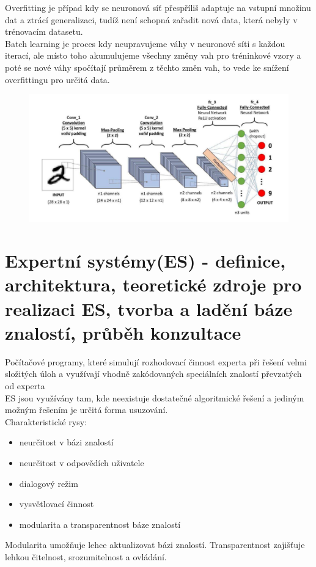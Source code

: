 Overfitting je případ kdy se neuronová síť přespříliš adaptuje na vstupní množinu dat a ztrácí generalizaci, tudíž není schopná zařadit nová data, která nebyly v trénovacím datasetu.\\
Batch learning je proces kdy neupravujeme váhy v neuronové síti s každou iterací, ale místo toho akumulujeme všechny změny vah pro tréninkové vzory a poté se nové váhy spočítají průměrem z těchto změn vah, to vede ke snížení overfittingu pro určitá data.\\

\begin{figure}[H]
    \includegraphics[scale = 1]{images/konvoluce.png}
\end{figure}
\newpage

\section{Expertní systémy(ES) - definice, architektura, teoretické zdroje pro realizaci ES, tvorba a ladění báze znalostí, průběh konzultace}
Počítačové programy, které simulují rozhodovací činnost experta při řešení velmi složitých úloh a využívají vhodně zakódovaných speciálních znalostí převzatých od experta\\
ES jsou využívány tam, kde neexistuje dostatečné algoritmické řešení a jediným možným řešením je určitá forma usuzování.\\
Charakteristické rysy:
\begin{itemize}
    \item neurčitost v bázi znalostí
    \item neurčitost v odpovědích uživatele
    \item dialogový režim
    \item vysvětlovací činnost
    \item modularita a transparentnost báze znalostí
\end{itemize}
Modularita umožňuje lehce aktualizovat bázi znalostí. Transparentnost zajišťuje lehkou čitelnost, srozumitelnost a ovládání.\\
